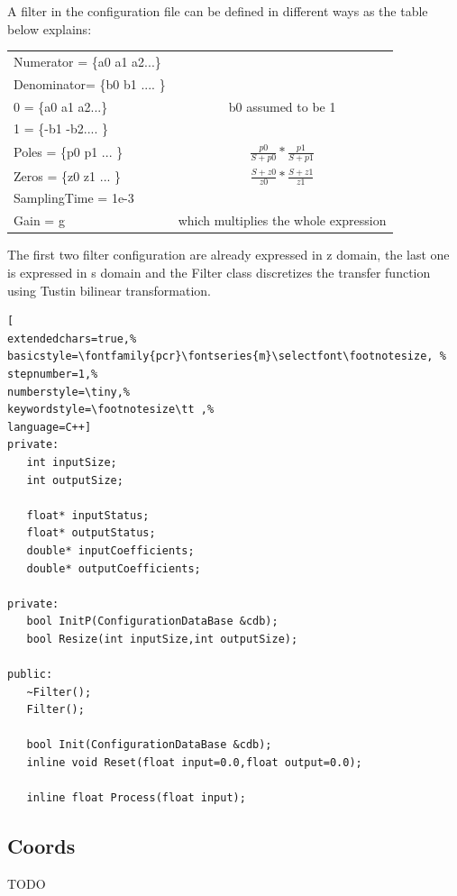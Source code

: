 A filter in the configuration file can be defined in different ways as the table below explains:


\begin{table}[!h]
 \begin{center}
  \begin{tabular}{|l|c|}
   \hline
Numerator  = \{a0 a1 a2...\} & \\
Denominator= \{b0 b1 .... \} & \\
   \hline
0  = \{a0 a1 a2...\} & b0 assumed to be 1 \\
1  = \{-b1 -b2.... \} & \\
   \hline
Poles  = \{p0 p1 ... \} & $\frac{p0}{S + p0} * \frac{p1}{S + p1}$  \\
Zeros  = \{z0 z1 ... \} & $\frac{S + z0}{z0} * \frac{S + z1}{z1}$  \\
SamplingTime = 1e-3 & \\
Gain = g  & which multiplies the whole expression \\
   \hline
  \end{tabular}
 \end{center}
\end{table}

The first two filter configuration are already expressed in z domain, the last one is expressed in s domain and the Filter class discretizes the transfer function using Tustin bilinear transformation.

\begin{lstlisting}[
extendedchars=true,%
basicstyle=\fontfamily{pcr}\fontseries{m}\selectfont\footnotesize, %
stepnumber=1,%
numberstyle=\tiny,%
keywordstyle=\footnotesize\tt ,%
language=C++]
private:
   int inputSize;
   int outputSize;

   float* inputStatus;
   float* outputStatus;
   double* inputCoefficients;
   double* outputCoefficients;

private:
   bool InitP(ConfigurationDataBase &cdb);
   bool Resize(int inputSize,int outputSize);

public:
   ~Filter();
   Filter();

   bool Init(ConfigurationDataBase &cdb);
   inline void Reset(float input=0.0,float output=0.0);

   inline float Process(float input);
\end{lstlisting}



\subsection{Coords}
TODO




